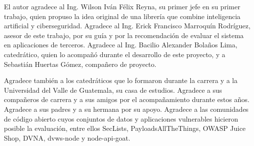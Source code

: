 El autor agradece al Ing. Wilson Iván Félix Reyna, su primer jefe en su primer trabajo, quien propuso la idea original de una librería que combine inteligencia artificial y ciberseguridad. Agradece al Ing. Erick Francisco Marroquín Rodríguez, asesor de este trabajo, por su guía y por la recomendación de evaluar el sistema en aplicaciones de terceros. Agradece al Ing. Bacilio Alexander Bolaños Lima, catedrático, quien lo acompañó durante el desarrollo de este proyecto, y a Sebastián Huertas Gómez, compañero de proyecto.

Agradece también a los catedráticos que lo formaron durante la carrera y a la Universidad del Valle de Guatemala, su casa de estudios. Agradece a sus compañeros de carrera y a sus amigos por el acompañamiento durante estos años. Agradece a sus padres y a su hermana por su apoyo. Agradece a las comunidades de código abierto cuyos conjuntos de datos y aplicaciones vulnerables hicieron posible la evaluación, entre ellos SecLists, PayloadsAllTheThings, OWASP Juice Shop, DVNA, dvws-node y node-api-goat.
